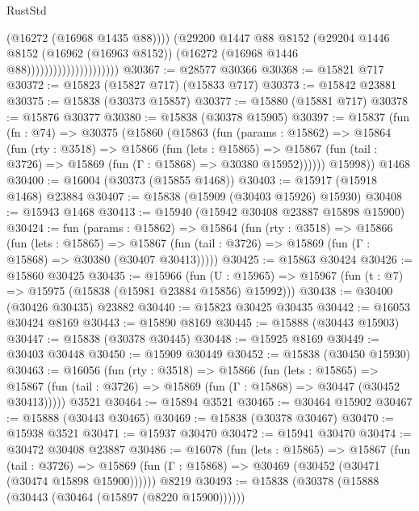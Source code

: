 \begin{lexlean}{RustStd}
\begin{coremodule}
                                          (@16272 (@16968 @1435 @88))))
                                      (@29200
                                        @1447
                                        @88
                                        @8152
                                        (@29204
                                          @1446
                                          @8152
                                          (@16962 (@16963 @8152))
                                          (@16272 (@16968 @1446 @88)))))))))))))))))))))
@30367 := @28577 @30366
@30368 := @15821 @717
@30372 := @15823 (@15827 @717) (@15833 @717)
@30373 := @15842 @23881
@30375 := @15838 (@30373 @15857)
@30377 := @15880 (@15881 @717)
@30378 := @15876 @30377
@30380 := @15838 (@30378 @15905)
@30397 := @15837
    (fun (fn : @74) =>
    @30375
      (@15860
        (@15863
          (fun (params : @15862) =>
          @15864
            (fun (rty : @3518) =>
            @15866
              (fun (lets : @15865) =>
              @15867 (fun (tail : @3726) => @15869 (fun (Γ : @15868) => @30380 @15952))))))
        @15998))
    @1468
@30400 := @16004 (@30373 (@15855 @1468))
@30403 := @15917 (@15918 @1468) @23884
@30407 := @15838 (@15909 (@30403 @15926) @15930)
@30408 := @15943 @1468
@30413 := @15940 (@15942 @30408 @23887 @15898 @15900)
@30424 := fun (params : @15862) =>
  @15864
    (fun (rty : @3518) =>
    @15866
      (fun (lets : @15865) =>
      @15867 (fun (tail : @3726) => @15869 (fun (Γ : @15868) => @30380 (@30407 @30413)))))
@30425 := @15863 @30424
@30426 := @15860 @30425
@30435 := @15966
    (fun (U : @15965) => @15967 (fun (t : @7) => @15975 (@15838 (@15981 @23884 @15856) @15992)))
@30438 := @30400 (@30426 @30435) @23882
@30440 := @15823 @30425 @30435
@30442 := @16053 @30424 @8169
@30443 := @15890 @8169
@30445 := @15888 (@30443 @15903)
@30447 := @15838 (@30378 @30445)
@30448 := @15925 @8169
@30449 := @30403 @30448
@30450 := @15909 @30449
@30452 := @15838 (@30450 @15930)
@30463 := @16056
    (fun (rty : @3518) =>
    @15866
      (fun (lets : @15865) =>
      @15867 (fun (tail : @3726) => @15869 (fun (Γ : @15868) => @30447 (@30452 @30413)))))
    @3521
@30464 := @15894 @3521
@30465 := @30464 @15902
@30467 := @15888 (@30443 @30465)
@30469 := @15838 (@30378 @30467)
@30470 := @15938 @3521
@30471 := @15937 @30470
@30472 := @15941 @30470
@30474 := @30472 @30408 @23887
@30486 := @16078
    (fun (lets : @15865) =>
    @15867
      (fun (tail : @3726) =>
      @15869 (fun (Γ : @15868) => @30469 (@30452 (@30471 (@30474 @15898 @15900))))))
    @8219
@30493 := @15838 (@30378 (@15888 (@30443 (@30464 (@15897 (@8220 @15900))))))

\end{coremodule}
\end{lexlean}
